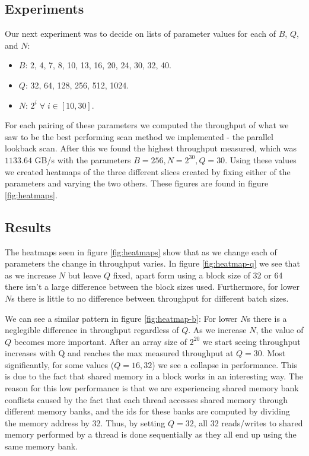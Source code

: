 \documentclass[twocolumn]{article}
\begin{document}
\subsection{Experiments}
Our next experiment was to decide on lists of parameter values for each of $B$, $Q$, and $N$:
\begin{itemize}
    \item $B$: 2, 4, 7, 8, 10, 13, 16, 20, 24, 30, 32, 40.
    \item $Q$: 32, 64, 128, 256, 512, 1024.
    \item $N$: $2^i \; \forall \; i \in [10,30]$.
\end{itemize}
For each pairing of these parameters we computed the throughput of what we saw to be the best performing scan method we implemented - the parallel lookback scan. After this we found the highest throughput measured, which was $1133.64$ GB/s with the parameters $B=256,N=2^30,Q=30$. Using these values we created heatmaps of the three different slices created by fixing either of the parameters and varying the two others. These figures are found in figure \ref{fig:heatmaps}.

\subsection{Results}
\label{sec:results}
The heatmaps seen in figure \ref{fig:heatmaps} show that as we change each of parameters the change in throughput varies. In figure \ref{fig:heatmap-q} we see that as we increase $N$ but leave $Q$ fixed, apart form using a block size of 32 or 64 there isn't a large difference between the block sizes used. Furthermore, for lower $N$s there is little to no difference between throughput for different batch sizes.

We can see a similar pattern in figure \ref{fig:heatmap-b}: For lower $N$s there is a neglegible difference in throughput regardless of $Q$. As we increase $N$, the value of $Q$ becomes more important. After an array size of $2^20$ we start seeing throughput increases with Q and reaches the max measured throughput at $Q=30$. Most significantly, for some values ($Q=16,32$) we see a collapse in performance. This is due to the fact that shared memory in a block works in an interesting way. The reason for this low performance is that we are experiencing shared memory bank conflicts caused by the fact that each thread accesses shared memory through different memory banks, and the ids for these banks are computed by dividing the memory address by 32. Thus, by setting $Q=32$, all 32 reads/writes to shared memory performed by a thread is done sequentially as they all end up using the same memory bank.
\end{document}
